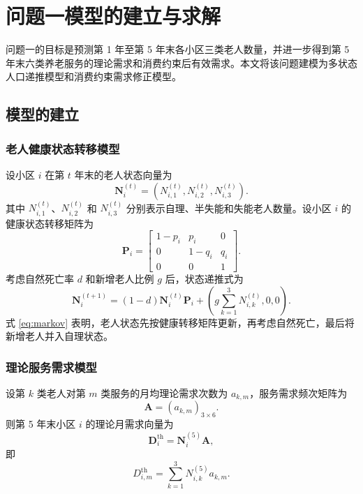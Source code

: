 \section{问题一模型的建立与求解}

问题一的目标是预测第 1 年至第 5 年末各小区三类老人数量，并进一步得到第 5 年末六类养老服务的理论需求和消费约束后有效需求。本文将该问题建模为多状态人口递推模型和消费约束需求修正模型。

\subsection{模型的建立}

\subsubsection{老人健康状态转移模型}

设小区 $i$ 在第 $t$ 年末的老人状态向量为
\begin{equation}
\bm{N}_{i}^{(t)}=\left(N_{i,1}^{(t)},N_{i,2}^{(t)},N_{i,3}^{(t)}\right).
\end{equation}
其中 $N_{i,1}^{(t)}$、$N_{i,2}^{(t)}$ 和 $N_{i,3}^{(t)}$ 分别表示自理、半失能和失能老人数量。设小区 $i$ 的健康状态转移矩阵为
\begin{equation}
\bm{P}_i=
\begin{bmatrix}
1-p_i & p_i & 0\\
0 & 1-q_i & q_i\\
0 & 0 & 1
\end{bmatrix}.
\end{equation}
考虑自然死亡率 $d$ 和新增老人比例 $g$ 后，状态递推式为
\begin{equation}
\bm{N}_{i}^{(t+1)}=(1-d)\bm{N}_{i}^{(t)}\bm{P}_i+
\left(g\sum_{k=1}^{3}N_{i,k}^{(t)},0,0\right).
\label{eq:markov}
\end{equation}
式 \eqref{eq:markov} 表明，老人状态先按健康转移矩阵更新，再考虑自然死亡，最后将新增老人并入自理状态。

\subsubsection{理论服务需求模型}

设第 $k$ 类老人对第 $m$ 类服务的月均理论需求次数为 $a_{k,m}$，服务需求频次矩阵为
\begin{equation}
\bm{A}=\left(a_{k,m}\right)_{3\times 6}.
\end{equation}
则第 5 年末小区 $i$ 的理论月需求向量为
\begin{equation}
\bm{D}_{i}^{\mathrm{th}}=\bm{N}_{i}^{(5)}\bm{A},
\end{equation}
即
\begin{equation}
D_{i,m}^{\mathrm{th}}=\sum_{k=1}^{3}N_{i,k}^{(5)}a_{k,m}.
\end{equation}

